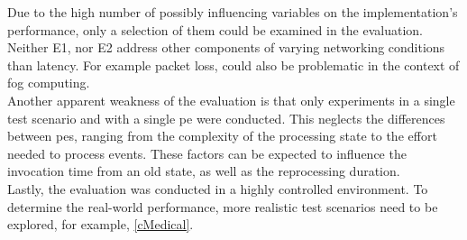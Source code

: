 Due to the high number of possibly influencing variables on the implementation's performance, only a selection of them could be examined in the evaluation.\\
Neither E1, nor E2 address other components of varying networking conditions than latency. For example packet loss, could also be problematic in the context of fog computing.\\
Another apparent weakness of the evaluation is that only experiments in a single test scenario and with a single \gls{pe} were conducted. This neglects the differences between \gls{pe}s, ranging from the complexity of the processing state to the effort needed to process events. These factors can be expected to influence the invocation time from an old state, as well as the reprocessing duration.\\
Lastly, the evaluation was conducted in a highly controlled environment. To determine the real-world performance, more realistic test scenarios need to be explored, for example, \ref{cMedical}.\par
